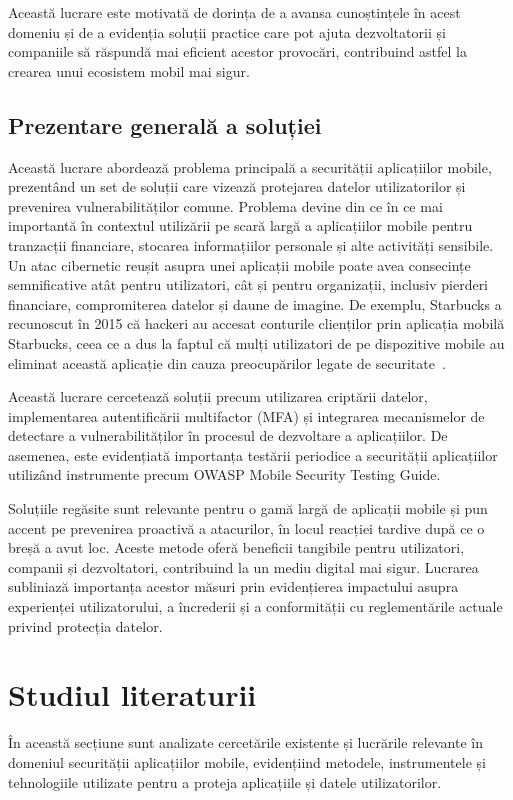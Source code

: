 \documentclass[runningheads]{llncs}
\begin{document}
Această lucrare este motivată de dorința de a avansa cunoștințele în acest domeniu și de a evidenția soluții practice care pot ajuta dezvoltatorii și companiile să răspundă mai eficient acestor provocări, contribuind astfel la crearea unui ecosistem mobil mai sigur.

\subsection{Prezentare generală a soluției}
Această lucrare abordează problema principală a securității aplicațiilor mobile, prezentând un set de soluții care vizează protejarea datelor utilizatorilor și prevenirea vulnerabilităților comune. Problema devine din ce în ce mai importantă în contextul utilizării pe scară largă a aplicațiilor mobile pentru tranzacții financiare, stocarea informațiilor personale și alte activități sensibile. Un atac cibernetic reușit asupra unei aplicații mobile poate avea consecințe semnificative atât pentru utilizatori, cât și pentru organizații, inclusiv pierderi financiare, compromiterea datelor și daune de imagine. De exemplu, Starbucks a recunoscut în 2015 că hackeri au accesat conturile clienților prin aplicația mobilă Starbucks, ceea ce a dus la faptul că mulți utilizatori de pe dispozitive mobile au eliminat această aplicație din cauza preocupărilor legate de securitate~\cite{starbucks}. 

Această lucrare cercetează soluții precum utilizarea criptării datelor, implementarea autentificării multifactor (MFA) și integrarea mecanismelor de detectare a vulnerabilităților în procesul de dezvoltare a aplicațiilor. De asemenea, este evidențiată importanța testării periodice a securității aplicațiilor utilizând instrumente precum OWASP Mobile Security Testing Guide.

Soluțiile regăsite sunt relevante pentru o gamă largă de aplicații mobile și pun accent pe prevenirea proactivă a atacurilor, în locul reacției tardive după ce o breșă a avut loc. Aceste metode oferă beneficii tangibile pentru utilizatori, companii și dezvoltatori, contribuind la un mediu digital mai sigur. Lucrarea subliniază importanța acestor măsuri prin evidențierea impactului asupra experienței utilizatorului, a încrederii și a conformității cu reglementările actuale privind protecția datelor.

\section{Studiul literaturii}
În această secțiune sunt analizate cercetările existente și lucrările relevante în domeniul securității aplicațiilor mobile, evidențiind metodele, instrumentele și tehnologiile utilizate pentru a proteja aplicațiile și datele utilizatorilor.
\end{document}
